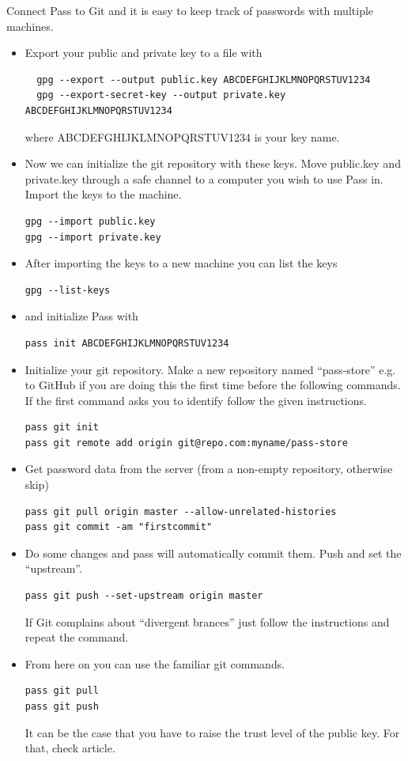 \documentclass{article}
\begin{document}
Connect Pass to Git and it is easy to keep track of passwords with multiple machines.
\begin{itemize}
\item Export your public and private key to a file with \\
\begin{verbatim}
  gpg --export --output public.key ABCDEFGHIJKLMNOPQRSTUV1234 
  gpg --export-secret-key --output private.key ABCDEFGHIJKLMNOPQRSTUV1234
\end{verbatim}
where ABCDEFGHIJKLMNOPQRSTUV1234 is your key name.\\
\item Now we can initialize the git repository with these keys. Move public.key and private.key through a safe channel to a computer you wish to use Pass in. Import the keys to the machine. \\
\begin{verbatim}
gpg --import public.key
gpg --import private.key
\end{verbatim}
\item After importing the keys to a new machine you can list the keys
\begin{verbatim}
gpg --list-keys 
\end{verbatim}
\item and initialize Pass with
\begin{verbatim}
pass init ABCDEFGHIJKLMNOPQRSTUV1234
\end{verbatim}
\item Initialize your git repository. Make a new repository named ``pass-store'' e.g. to GitHub if you are doing this the first time before the following commands. If the first command asks you to identify follow the given instructions.\\
\begin{verbatim}
pass git init 
pass git remote add origin git@repo.com:myname/pass-store
\end{verbatim}
\item Get password data from the server (from a non-empty repository, otherwise skip)
\begin{verbatim}
pass git pull origin master --allow-unrelated-histories
pass git commit -am "firstcommit"
\end{verbatim}
\item Do some changes and pass will automatically commit them. Push and set the ``upstream''. \\
\begin{verbatim}
pass git push --set-upstream origin master 
\end{verbatim}
If Git complains about ``divergent brances'' just follow the instructions and repeat the command.
\item From here on you can use the familiar git commands. \\
\begin{verbatim}
pass git pull 
pass git push 
\end{verbatim}
It can be the case that you have to raise the trust level of the public key. For that, check  article. 
\end{itemize}
\end{document}
